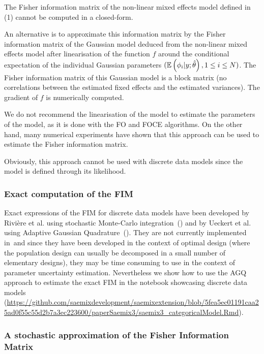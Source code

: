 The Fisher information matrix of the non-linear mixed effects model defined in (1) cannot be computed in a closed-form.

An alternative is to approximate this information matrix  by the Fisher information matrix of the Gaussian model deduced from the non-linear mixed effects model after linearisation of the function $f$ around the conditional expectation of the individual Gaussian parameters $(\mathbb{E}\left(\phi_{i}|y;\hat{\theta}\right), 1\leq
i \leq N) $. The Fisher information matrix of this Gaussian model is a block matrix (no correlations between the estimated fixed effects and the estimated variances). The gradient of $f$ is numerically computed.

 We do not recommend the linearisation of the model to estimate the parameters of the model, as it is done with the FO and FOCE algorithms. On the other hand, many numerical experiments have shown that this approach can be used to estimate the Fisher information matrix.

 Obviously, this approach cannot be used with discrete data models since the model is defined through its likelihood. 

\subsubsection{Exact computation of the FIM}

Exact expressions of the FIM for discrete data models have been developed by Rivière et al. using stochastic Monte-Carlo integration~(\cite{Riviere16}) and by Ueckert et al. using Adaptive Gaussian Quadrature~(\cite{Ueckert16}). They are not currently implemented in~\saemix and since they have been developed in the context of optimal design (where the population design can usually be decomposed in a small number of elementary designs), they may be time consuming to use in the context of parameter uncertainty estimation. Nevertheless we show how to use the AGQ approach to estimate the exact FIM in the notebook showcasing discrete data models (\url{https://github.com/saemixdevelopment/saemixextension/blob/5fea5ec01191caa25ad0f55c55d2b7a3ec223600/paperSaemix3/saemix3_categoricalModel.Rmd}).

\subsubsection{A stochastic approximation of the Fisher Information Matrix}

